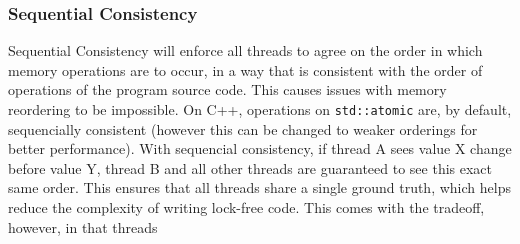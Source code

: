 \documentclass[11pt, a4paper]{article}
\theoremstyle{definition}
\theoremstyle{remark}
\begin{document}
\subsubsection{Sequential Consistency}
Sequential Consistency will enforce all threads to agree on the order in which memory operations are to occur, in a way that is consistent with 
the order of operations of the program source code. This causes issues with memory reordering to be impossible. On C++, operations on \lstinline|std::atomic| are, by default, sequencially consistent (however this can be changed to 
weaker orderings for better performance). With sequencial consistency, if thread A sees value X change before value Y, thread B and all other threads are guaranteed to see this exact same order. This ensures that all threads share a single ground truth, which helps reduce the complexity of 
writing lock-free code. This comes with the tradeoff, however, in that threads 
\end{document}

